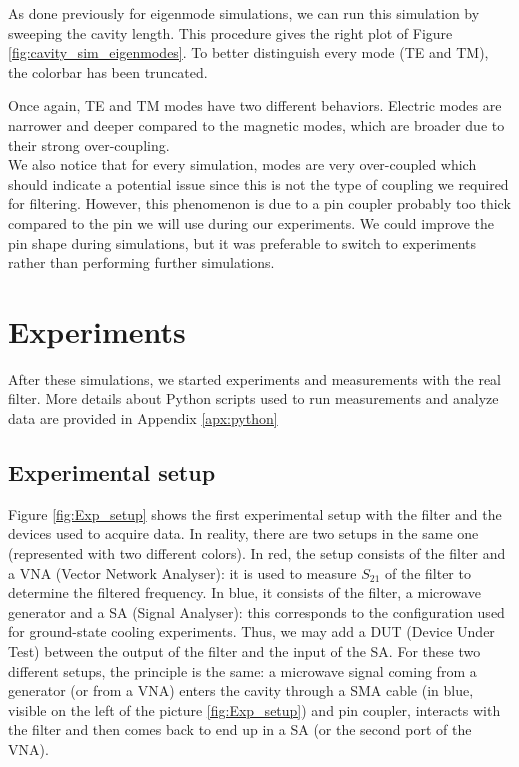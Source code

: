 \documentclass[11pt,a4pape,longbibliography]{article}
\begin{document}
As done previously for eigenmode simulations, we can run this simulation by sweeping the cavity length. This procedure gives the right plot of Figure \ref{fig:cavity_sim_eigenmodes}. To better distinguish every mode (TE and TM), the colorbar has been truncated.

Once again, TE and TM modes have two different behaviors. Electric modes are narrower and deeper compared to the magnetic modes, which are broader due to their strong over-coupling.\\

We also notice that for every simulation, modes are very over-coupled which should indicate a potential issue since this is not the type of coupling we required for filtering. However, this phenomenon is due to a pin coupler probably too thick compared to the pin we will use during our experiments. We could improve the pin shape during simulations, but it was preferable to switch to experiments rather than performing further simulations.

\section{Experiments}

After these simulations, we started experiments and measurements with the real filter. More details about Python scripts used to run measurements and analyze data are provided in Appendix \ref{apx:python}

\subsection{Experimental setup}

Figure \ref{fig:Exp_setup} shows the first experimental setup with the filter and the devices used to acquire data. In reality, there are two setups in the same one (represented with two different colors). In red, the setup consists of the filter and a VNA (Vector Network Analyser): it is used to measure $S_{21}$ of the filter to determine the filtered frequency. In blue, it consists of the filter, a microwave generator and a SA (Signal Analyser): this corresponds to the configuration used for ground-state cooling experiments. Thus, we may add a DUT (Device Under Test) between the output of the filter and the input of the SA. For these two different setups, the principle is the same: a microwave signal coming from a generator (or from a VNA) enters the cavity through a SMA cable (in blue, visible on the left of the picture \ref{fig:Exp_setup}) and pin coupler, interacts with the filter and then comes back to end up in a SA (or the second port of the VNA).
\end{document}
